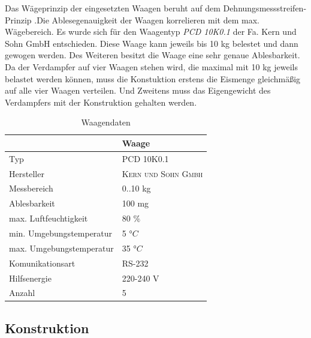 Das Wägeprinzip der eingesetzten Waagen beruht auf dem Dehnungsmessstreifen-Prinzip .Die Ablesegenauigkeit der Waagen korrelieren mit dem max. Wägebereich. Es wurde sich für den Waagentyp \textit{PCD 10K0.1} der Fa. Kern und Sohn GmbH entschieden. Diese Waage kann  jeweils  bis 10 kg belestet und dann gewogen werden. Des Weiteren besitzt die Waage eine sehr genaue Ablesbarkeit. Da der Verdampfer auf vier Waagen stehen wird, die maximal mit 10 kg jeweils belastet werden können, muss die Konstuktion erstens die Eismenge gleichmäßig auf alle vier Waagen verteilen. Und Zweitens muss das Eigengewicht des Verdampfers mit der Konstruktion gehalten werden. 


 
\begin{table}[htb]
\centering
\caption{Waagendaten}\vspace{6pt}
\begin{tabular}{ll}
\hline 
 & \textbf{Waage}  \\ 
\hline 
\hline 
Typ & PCD 10K0.1 \\ 
\hline 
Hersteller & \textsc{Kern und Sohn Gmbh} \\ 
\hline 
Messbereich & 0..10 kg \\ 
\hline 
Ablesbarkeit & 100 mg\\ 
\hline 
max. Luftfeuchtigkeit & 80 $\%$\\
\hline
min. Umgebungstemperatur & 5 $°C$\\
\hline
max. Umgebungstemperatur & 35 $°C$\\
\hline
Komunikationsart & RS-232 \\ 
\hline 
Hilfsenergie & 220-240  V   \\ 
\hline
Anzahl & 5 \\ 
\hline 
\hline 
\end{tabular} 
\label{tab:Waagendaten}
\end{table}



\subsection{Konstruktion}
\label{subsec:Waagen-Konstruktion}


